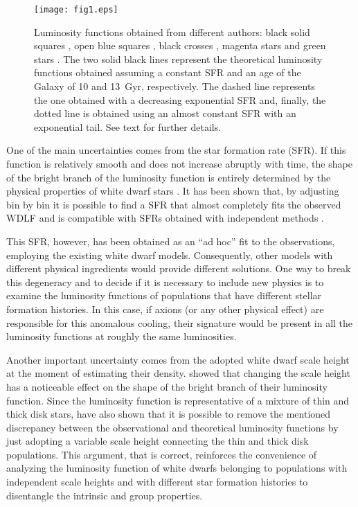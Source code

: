 \documentclass[useAMS,usenatbib]{mnras}
\begin{document}
\begin{figure}
\centering
\texttt{[image: fig1.eps]}
\caption{ Luminosity  functions  obtained  from different authors:
black solid squares \citep{harr06},  open blue squares \citep{dege08}, black crosses \citep{krze09}, magenta stars \citep{rowe11} and green stars \citep{munn17}.  The two solid black  lines represent the  theoretical  luminosity functions  obtained   assuming  a  constant SFR and an age of  the Galaxy of 10 and 13~Gyr, respectively. The dashed line represents the one obtained with  a decreasing exponential SFR and, finally, the dotted line is obtained using an almost constant SFR with an exponential tail. See text for further details. 
}
\label{fig1}
\end{figure}

One  of the  main uncertainties  comes  from the  star formation  rate
(SFR).  If  this function  is relatively smooth  and does not increase
abruptly with time,  the shape of the bright branch  of the luminosity
function is  entirely determined by  the physical properties  of white
dwarf  stars \citep{iser08}.   It has  been shown  \citep{rowe13} that, by
adjusting  bin  by bin  it  is  possible to  find  a  SFR that  almost
completely  fits the  observed WDLF  and is compatible with  SFRs 
obtained with independent methods \citep{cign06}.

This  SFR, however,  has been  obtained as  an ``ad  hoc'' fit  to the
observations, employing the existing white dwarf models. Consequently,
other  models  with  different   physical  ingredients  would  provide
different solutions. One way to break this degeneracy and to decide if
it is  necessary to include new  physics is to examine  the luminosity
functions  of  populations  that   have  different  stellar  formation
histories. In this case, if  axions (or any other physical effect) 
are responsible for this anomalous cooling,  their  signature would  be  present  in all  the  luminosity
functions  at  roughly  the  same  luminosities.  

Another important uncertainty comes from the adopted white dwarf scale 
height at the moment of estimating their density. \citet{harr06} showed that 
changing the scale height has a noticeable effect on the shape of the bright 
branch of their luminosity function.  Since the \citet{munn17} luminosity function is 
representative of a mixture of thin and thick disk stars, \citet{kili17} have also shown that it is 
possible to remove the mentioned discrepancy between the observational and 
theoretical luminosity functions by just adopting a variable scale height 
connecting the thin and thick disk populations. This argument, that 
is correct, reinforces the convenience of analyzing the luminosity function of 
white dwarfs belonging to populations with independent scale heights and with different star 
formation histories to disentangle the intrinsic and group properties.
\end{document}
